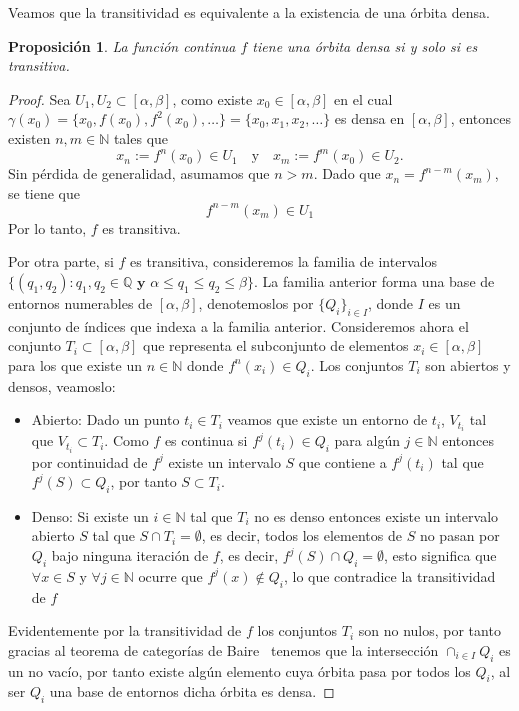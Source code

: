 \documentclass[12pt,a4paper]{report}
\newtheorem{proposicion}{Proposición}[section]
\theoremstyle{definition}
\begin{document}
Veamos que la transitividad es equivalente a la existencia de una órbita densa. 

\begin{proposicion}\label{Prop3.1}
La función continua $f$ tiene una órbita densa si y solo si es transitiva.
\end{proposicion}

\begin{proof}
Sea $U_1, U_2 \subset [\alpha,\beta]$, como existe $x_0 \in [\alpha,\beta]$ en el cual
\newline
$\gamma(x_0) = \{x_0, f(x_0), f^2(x_0), \dots\} = \{x_0, x_1, x_2, \dots\}$
es densa en $[\alpha,\beta]$, entonces existen $n, m \in \mathbb{N}$ tales que  
\[
x_n := f^n(x_0) \in U_1 \quad \text{y} \quad x_m := f^m(x_0) \in U_2.
\]  
Sin pérdida de generalidad, asumamos que $n > m$.  
Dado que $x_n = f^{n-m}(x_m)$, se tiene que  
\[
f^{n-m}(x_m) \in U_1
\]  
Por lo tanto, $f$ es transitiva.

Por otra parte, si $f$ es transitiva, consideremos la familia de intervalos 
\newline
$\{(q_1,q_2) \colon q_1,q_2 \in \mathbb{Q} \textbf{ y } \alpha \leq q_1 \leq q_2 \leq \beta \}$. La familia anterior forma una base de entornos numerables de $[\alpha,\beta]$, denotemoslos por $\{ Q_i\}_{i \in I}$, donde $I$ es un conjunto de índices que indexa a la familia anterior. Consideremos ahora el conjunto $T_i \subset [\alpha,\beta]$ que representa el subconjunto de elementos $x_i \in [\alpha,\beta]$ para los que existe un $n \in \mathbb{N}$ donde $f^n(x_i) \in Q_i$. Los conjuntos $T_i$ son abiertos y densos, veamoslo:

\begin{itemize}
    \item Abierto: Dado un punto $t_i \in T_i$ veamos que existe un entorno de $t_i$, $V_{t_i}$ tal que $V_{t_i} \subset T_i$. Como $f$ es continua si $f^j(t_i) \in Q_i$ para algún $j \in \mathbb{N}$ entonces por continuidad de $f^j$ existe un intervalo $S$ que contiene a $f^j(t_i)$ tal que $f^j(S) \subset Q_i$, por tanto $S \subset T_i$. 


    \item Denso: Si existe un $i \in \mathbb{N}$ tal que $T_i$ no es denso entonces existe un intervalo abierto $S$ tal que $S \cap T_i = \emptyset$, es decir, todos los elementos de $S$ no pasan por $Q_i$ bajo ninguna iteración de $f$, es decir, $f^j(S) \cap Q_i = \emptyset$, esto significa que $\forall x \in S \text{ y } \forall j \in \mathbb{N} \text{ ocurre que } f^j(x) \notin Q_i$, lo que contradice la transitividad de $f$
\end{itemize}

Evidentemente por la transitividad de $f$ los conjuntos $T_i$ son no nulos, por tanto gracias al teorema de categorías de Baire~\cite{ref3} tenemos que la intersección $\cap_{i \in I}Q_i$ es un no vacío, por tanto existe algún elemento cuya órbita pasa por todos los $Q_i$, al ser $Q_i$ una base de entornos dicha órbita es densa.

\end{proof}
\end{document}
